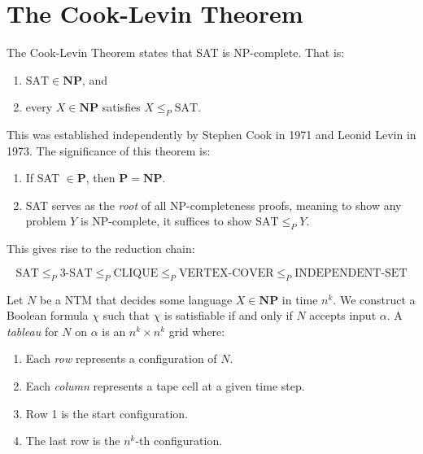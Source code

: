 \documentclass[12pt,a4paper,openany]{article}
\begin{document}
\section{The Cook-Levin Theorem}

The Cook-Levin Theorem states that SAT is NP-complete. That is:

\begin{enumerate}
    \item $\text{SAT} \in \mathbf{NP}$, and
    \item every $X \in \mathbf{NP}$ satisfies $X \leq_P \text{SAT}$.
\end{enumerate}

This was established independently by Stephen Cook in 1971 and Leonid Levin in 1973. The significance of this theorem is:

\begin{enumerate}
    \item If SAT $\in \mathbf{P}$, then $\mathbf{P} = \mathbf{NP}$.
    \item SAT serves as the \emph{root} of all NP-completeness proofs, meaning to show any problem $Y$ is NP-complete, it suffices to show $\text{SAT} \leq_P Y$.
\end{enumerate}

This gives rise to the reduction chain:

\[
\text{SAT} \leq_P \text{3-SAT} \leq_P \text{CLIQUE} \leq_P \text{VERTEX-COVER} \leq_P \text{INDEPENDENT-SET}
\]

Let $N$ be a NTM that decides some language $X \in \mathbf{NP}$ in time $n^k$. We construct a Boolean formula $\chi$ such that $\chi$ is satisfiable if and only if $N$ accepts input $\alpha$.
A \emph{tableau} for $N$ on $\alpha$ is an $n^k \times n^k$ grid where:

\begin{enumerate}
    \item Each \emph{row} represents a configuration of $N$.
    \item Each \emph{column} represents a tape cell at a given time step.
    \item Row 1 is the start configuration.
    \item The last row is the $n^k$-th configuration.
\end{enumerate}
\end{document}
